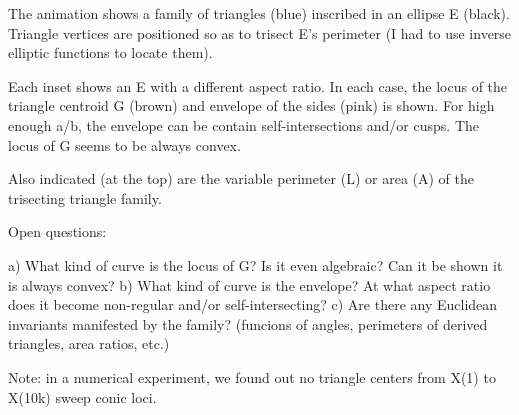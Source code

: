 The animation shows a family of triangles (blue) inscribed in an ellipse E (black). Triangle vertices are positioned so as to trisect E's perimeter (I had to use inverse elliptic functions to locate them).

Each inset shows an E with a different aspect ratio. In each case, the locus of the triangle centroid G (brown) and envelope of the sides (pink) is shown. For high enough a/b, the envelope can be contain self-intersections and/or cusps. The locus of G seems to be always convex.

Also indicated (at the top) are the variable perimeter (L) or area (A) of the trisecting triangle family. 

Open questions:

a) What kind of curve is the locus of G? Is it even algebraic? Can it be shown it is always convex?
b) What kind of curve is the envelope? At what aspect ratio does it become non-regular and/or self-intersecting?
c) Are there any Euclidean invariants manifested by the family? (funcions of angles, perimeters of derived triangles, area ratios, etc.)

Note: in a numerical experiment, we found out no triangle centers from X(1) to X(10k) sweep conic loci.